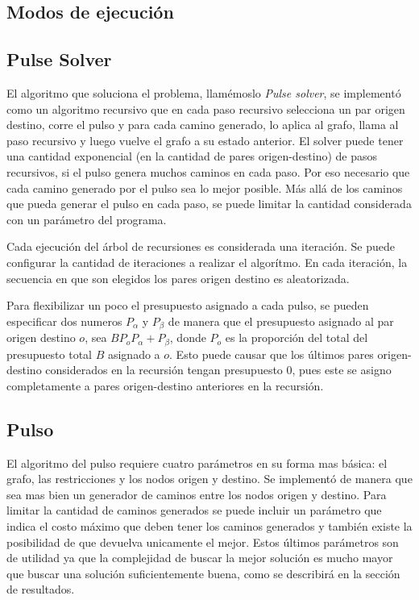\documentclass{article}
\begin{document}
  \subsection*{Modos de ejecución}

  \subsection*{Pulse Solver}

  El algoritmo que soluciona el problema, llamémoslo {\it Pulse solver}, se implementó como un algoritmo recursivo que en cada paso recursivo selecciona un par origen destino, corre el pulso y para cada camino generado, lo aplica al grafo, llama al paso recursivo y luego vuelve el grafo a su estado anterior. El solver puede tener una cantidad exponencial (en la cantidad de pares origen-destino) de pasos recursivos, si el pulso genera muchos caminos en cada paso. Por eso necesario que cada camino generado por el pulso sea lo mejor posible. Más allá de los caminos que pueda generar el pulso en cada paso, se puede limitar la cantidad considerada con un parámetro del programa.

  Cada ejecución del árbol de recursiones es considerada una iteración. Se puede configurar la cantidad de iteraciones a realizar el algorítmo. En cada iteración, la secuencia en que son elegidos los pares origen destino es aleatorizada.

  Para flexibilizar un poco el presupuesto asignado a cada pulso, se pueden especificar dos numeros $P_{\alpha}$ y $P_{\beta}$ de manera que el presupuesto asignado al par origen destino $o$, sea $BP_oP_{\alpha} + P_{\beta}$, donde $P_o$ es la proporción del total del presupuesto total $B$ asignado a $o$. Esto puede causar que los últimos pares origen-destino considerados en la recursión tengan presupuesto $0$, pues este se asigno completamente a pares origen-destino anteriores en la recursión.

  \subsection*{Pulso}

  El algoritmo del pulso requiere cuatro parámetros en su forma mas básica: el grafo, las restricciones y los nodos origen y destino. Se implementó de manera que sea mas bien un generador de caminos entre los nodos origen y destino. Para limitar la cantidad de caminos generados se puede incluir un parámetro que indica el costo máximo que deben tener los caminos generados y también existe la posibilidad de que devuelva unicamente el mejor. Estos últimos parámetros son de utilidad ya que la complejidad de buscar la mejor solución es mucho mayor que buscar una solución suficientemente buena, como se describirá en la sección de resultados.
\end{document}
